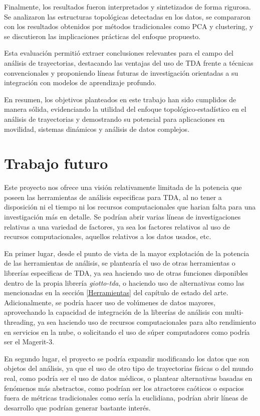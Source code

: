 Finalmente, los resultados fueron interpretados y sintetizados de forma rigurosa. Se analizaron las estructuras topológicas detectadas en los datos, se compararon con los resultados obtenidos por métodos tradicionales como PCA y clustering, y se discutieron las implicaciones prácticas del enfoque propuesto. 

Esta evaluación permitió extraer conclusiones relevantes para el campo del análisis de trayectorias, destacando las ventajas del uso de TDA frente a técnicas convencionales y proponiendo líneas futuras de investigación orientadas a su integración con modelos de aprendizaje profundo.

En resumen, los objetivos planteados en este trabajo han sido cumplidos de manera sólida, evidenciando la utilidad del enfoque topológico-estadístico en el análisis de trayectorias y demostrando su potencial para aplicaciones en movilidad, sistemas dinámicos y análisis de datos complejos.


\section{Trabajo futuro} \label{sct:resultados_trabajofuturo}

Este proyecto nos ofrece una visión relativamente limitada de la potencia que poseen las herramientas de análisis especificas para TDA, al no tener a disposición ni el tiempo ni los recursos computacionales que harian falta para una investigación más en detalle. Se podrían abrir varias líneas de investigaciones relativas a una variedad de factores, ya sea los factores relativos al uso de recursos computacionales, aquellos relativos a los datos usados, etc.

En primer lugar, desde el punto de vista de la mayor explotación de la potencia de las herramientas de análisis, se plantearía el uso de otras herramientas o librerías especificas de TDA, ya sea haciendo uso de otras funciones disponibles dentro de la propia librería \textit{giotto-tda}, o haciendo uso de alternativas como las mencionadas en la sección \ref{Herramientas} del capítulo de estado del arte. Adicionalmente, se podría hacer uso de volúmenes de datos mayores, aprovechando la capacidad de integración de la librerías de análisis con multi-threading, ya sea haciendo uso de recursos computacionales para alto rendimiento en servicios en la nube, o solicitando el uso de súper computadores como podría ser el Magerit-3.

En segundo lugar, el proyecto se podría expandir modificando los datos que son objetos del análisis, ya que el uso de otro tipo de trayectorias físicas o del mundo real, como podría ser el uso de datos médicos, o plantear alternativas basadas en fenómenos más abstractos, como podrían ser los atractores caóticos o espacios fuera de métricas tradicionales como sería la euclidiana, podrían abrir líneas de desarrollo que podrían generar bastante interés. 

